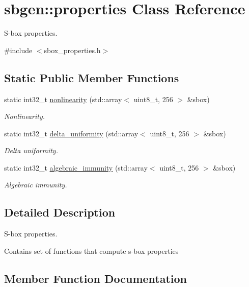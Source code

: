 \hypertarget{classsbgen_1_1properties}{}\section{sbgen\+:\+:properties Class Reference}
\label{classsbgen_1_1properties}


S-\/box properties.  




{\ttfamily \#include $<$sbox\+\_\+properties.\+h$>$}

\subsection*{Static Public Member Functions}
\begin{DoxyCompactItemize}
\item 
static int32\+\_\+t \hyperlink{classsbgen_1_1properties_afafede1403d78556e75ae0f0398863bd}{nonlinearity} (std\+::array$<$ uint8\+\_\+t, 256 $>$ \&sbox)
\begin{DoxyCompactList}\small\item\em Nonlinearity. \end{DoxyCompactList}\item 
static int32\+\_\+t \hyperlink{classsbgen_1_1properties_aeb2b1e1face945698d11ae92b7dbd9c9}{delta\+\_\+uniformity} (std\+::array$<$ uint8\+\_\+t, 256 $>$ \&sbox)
\begin{DoxyCompactList}\small\item\em Delta uniformity. \end{DoxyCompactList}\item 
static int32\+\_\+t \hyperlink{classsbgen_1_1properties_aa5fb745836fcd844f7099f9bab7a165d}{algebraic\+\_\+immunity} (std\+::array$<$ uint8\+\_\+t, 256 $>$ \&sbox)
\begin{DoxyCompactList}\small\item\em Algebraic immunity. \end{DoxyCompactList}\end{DoxyCompactItemize}


\subsection{Detailed Description}
S-\/box properties. 

Contains set of functions that compute s-\/box properties 

\subsection{Member Function Documentation}
\mbox{\label{classsbgen_1_1properties_aa5fb745836fcd844f7099f9bab7a165d}} 
